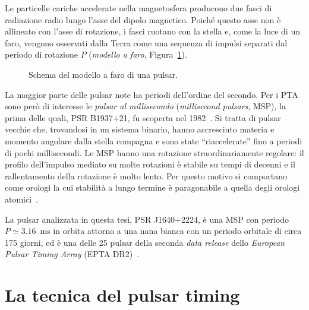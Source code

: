 Le particelle cariche accelerate nella magnetosfera producono due fasci di radiazione radio lungo l'asse del dipolo magnetico. Poiché questo asse non è allineato con l'asse di rotazione, i fasci ruotano con la stella e, come la luce di un faro, vengono osservati dalla Terra come una sequenza di impulsi separati dal periodo di rotazione $P$ (\textit{modello a faro}, Figura~\ref{fig:faro}).

\begin{figure}[h!]
    \centering
    \caption{\footnotesize Schema del modello a faro di una pulsar.}
    \label{fig:faro}
\end{figure}

La maggior parte delle pulsar note ha periodi dell'ordine del secondo. Per i PTA sono però di interesse le \textit{pulsar al millisecondo} (\textit{millisecond pulsars}, MSP), la prima delle quali, PSR B1937+21, fu scoperta nel 1982~\cite{Backer1982}. Si tratta di pulsar vecchie che, trovandosi in un sistema binario, hanno accresciuto materia e momento angolare dalla stella compagna e sono state ``riaccelerate'' fino a periodi di pochi millisecondi. Le MSP hanno una rotazione straordinariamente regolare: il profilo dell'impulso mediato su molte rotazioni è stabile su tempi di decenni e il rallentamento della rotazione è molto lento. Per questo motivo si comportano come orologi la cui stabilità a lungo termine è paragonabile a quella degli orologi atomici~\cite{Taylor2021, LorimerKramer2005}.

La pulsar analizzata in questa tesi, PSR J1640+2224, è una MSP con periodo $P \simeq 3.16$~ms in orbita attorno a una nana bianca con un periodo orbitale di circa 175 giorni, ed è una delle 25 pulsar della seconda \textit{data release} dello \textit{European Pulsar Timing Array} (EPTA DR2)~\cite{EPTA2023_DR2data}. %

\section{La tecnica del pulsar timing} \label{sec:timing}

